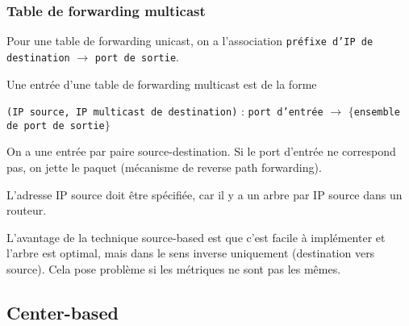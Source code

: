 \documentclass[10pt,a4paper]{report}
\begin{document}
			\subsubsection{Table de forwarding multicast}
			
			Pour une table de forwarding unicast, on a l'association \texttt{préfixe d'IP de destination} $\rightarrow$ \texttt{port de sortie}.
			
			Une entrée d'une table de forwarding multicast est de la forme
			
			\begin{center}
\texttt{(IP source, IP multicast de destination)} : \texttt{port d'entrée} $\rightarrow$ $\lbrace$\texttt{ensemble de port de sortie}$\rbrace$
\end{center}
			
			On a une entrée par paire source-destination. Si le port d'entrée ne correspond pas, on jette le paquet (mécanisme de reverse path forwarding).
		
			L'adresse IP source doit être spécifiée, car il y a un arbre par IP source dans un routeur.
		
		
			L'avantage de la technique source-based est que c'est facile à implémenter et l'arbre est optimal, mais dans le sens inverse uniquement (destination vers source). Cela pose problème si les métriques ne sont pas les mêmes.		
		
		
		\subsection{Center-based}
		
		
		
		
\end{document}
